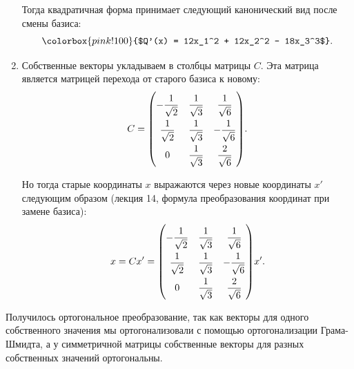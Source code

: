 \documentclass[a4paper]{article}
\begin{document}
\begin{solution}
\begin{enumerate}[label=\arabic*)]
            Тогда квадратичная форма принимает следующий канонический вид после смены базиса:
            \begin{equation*}
                \colorbox{pink!100}{$Q'(x) = 12x_1^2 + 12x_2^2 - 18x_3^3$}.
            \end{equation*}

        \item
            Собственные векторы укладываем в столбцы матрицы $C$. Эта матрица является матрицей перехода от старого базиса к новому:
            \begin{equation*}
                C = 
                {\renewcommand{\arraystretch}{2}
                \begin{pmatrix}
                    -\dfrac{1}{\sqrt{2}} & \dfrac{1}{\sqrt{3}} & \dfrac{1}{\sqrt{6}} \\
                    \dfrac{1}{\sqrt{2}} & \dfrac{1}{\sqrt{3}} & -\dfrac{1}{\sqrt{6}} \\
                    0 & \dfrac{1}{\sqrt{3}} & \dfrac{2}{\sqrt{6}} \\
                \end{pmatrix}}.
            \end{equation*}

            Но тогда старые координаты $x$ выражаются через новые координаты $x'$ следующим образом (лекция 14, формула преобразования координат при замене базиса):
            \begin{equation*}
                x = Cx'
                = {\renewcommand{\arraystretch}{2}
                \begin{pmatrix}
                    -\dfrac{1}{\sqrt{2}} & \dfrac{1}{\sqrt{3}} & \dfrac{1}{\sqrt{6}} \\
                    \dfrac{1}{\sqrt{2}} & \dfrac{1}{\sqrt{3}} & -\dfrac{1}{\sqrt{6}} \\
                    0 & \dfrac{1}{\sqrt{3}} & \dfrac{2}{\sqrt{6}} \\
                \end{pmatrix}} x'.
            \end{equation*}
        \end{enumerate}

        Получилось ортогональное преобразование, так как векторы для одного собственного значения мы ортогонализовали с помощью ортогонализации Грама-Шмидта, а у симметричной матрицы собственные векторы для разных собственных значений ортогональны.
    \end{solution}
\end{document}
